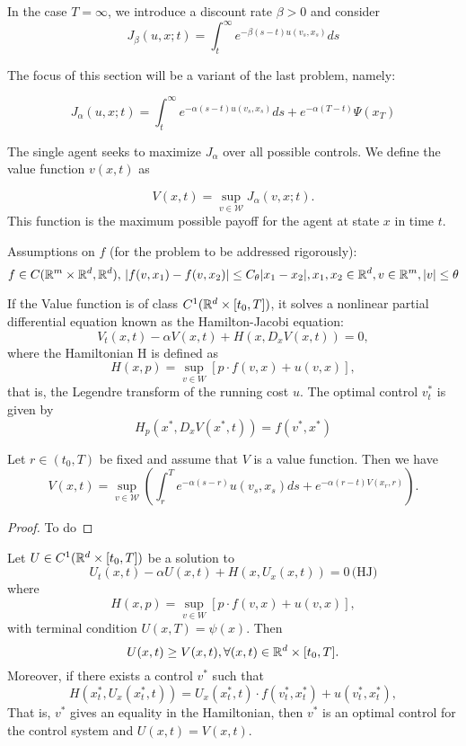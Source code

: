 \documentclass{article}
\begin{document}
In the case $T = \infty$, we introduce a discount rate $\beta > 0$ and consider
$$
J_\beta (u,x;t) = \int_t^\infty e^{-\beta (s - t) u(v_s, x_s)} ds 
$$

The focus of this section will be a variant of the last problem, namely:

$$
J_\alpha (u,x;t) = \int_t^\infty e^{-\alpha (s - t) u(v_s, x_s)} ds + e^{-\alpha (T -t)} \Psi(x_T) 
$$

The single agent seeks to maximize $J_\alpha$ over all possible controls.
We define the value function $v(x,t)$ as

$$
V(x,t) = \sup_{v\in \mathcal{W}} J_\alpha (v, x ; t).
$$
This function is the maximum possible payoff for the agent at state $x$ in time $t$.

Assumptions on $f$ (for the problem to be addressed rigorously):
$$f \in C(\mathbb{R}^m \times \mathbb{R}^d, \mathbb{R}^d),\, |f(v, x_1) - f(v, x_2)| \leq C_\theta |x_1 - x_2|, x_1, x_2 \in \mathbb{R}^d, v\in \mathbb{R}^m, |v| \leq \theta$$

If the Value function is of class $C^1(\mathbb{R}^d \times [t_0,T])$, it solves  a nonlinear partial differential equation known as the Hamilton-Jacobi equation:
$$V_t(x,t) - \alpha V(x,t) + H(x,D_x V(x,t)) = 0,$$
where the Hamiltonian H is defined as 
$$H(x,p) = \sup_{v\in W} [p \cdot f(v,x) + u(v,x)],$$
that is, the Legendre transform of the running cost $u$.
The optimal control $v_t^*$ is given by 
$$ H_p (x^*, D_x V(x^*,t)) = f(v^*, x^*)$$


\begin{proposition}
    Let $r \in (t_0, T)$ be fixed and assume that $V$ is a value function. Then we have
    $$
    V(x,t) = \sup_{v\in \mathcal{W}} \left( \int_r^T e^{-\alpha (s-r)} u(v_s,x_s) ds + e^{-\alpha (r - t) V(x_r,r)} \right).
    $$
\end{proposition}

\begin{proof}
    To do
\end{proof}

\begin{proposition}
    Let $U \in C^1(\mathbb{R}^d \times [t_0, T])$ be a solution to 
    $$
    U_t(x,t) - \alpha U(x,t) + H(x, U_x(x,t)) = 0\, \text{(HJ)}
    $$
    where 
    $$
    H(x,p) = \sup_{v \in W} [p \cdot f(v,x) + u(v,x)],
    $$
    with terminal condition $U(x,T) = \psi(x)$. Then
    $$U(x,t) \geq V(x,t), \forall (x,t) \in \mathbb{R}^d \times [t_0,T].$$
    Moreover, if there exists a control $v^*$ such that
    $$
    H(x^*_t, U_x (x^*_t, t)) = U_x(x^*_t, t)\cdot f(v^*_t, x^*_t) + u(v^*_t, x^*_t),
    $$
    That is, $v^*$ gives an equality in the Hamiltonian, then $v^*$ is an optimal control for the control system and $U(x,t) = V(x,t)$.
\end{proposition}
\end{document}
